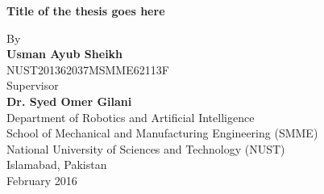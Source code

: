 \documentclass[11pt,a4paper]{report}
\numberwithin{equation}{section}
\begin{document}
    \newpage
    \begin{titlepage}
        \centering
        \vspace {1cm}
        \huge{\textbf{Title of the thesis goes here}} \\ [0.75cm]
        \begin{figure}[ht!]
            \centering
            \def\svgwidth{0.5\columnwidth}
            
        \end{figure}
        \vspace {0.5cm}
        \Large{By} \\
        \Large{\textbf{Usman Ayub Sheikh}} \\
        \Large{NUST201362037MSMME62113F} \\[0.75cm]
        \Large{Supervisor} \\
        \Large{\textbf{Dr. Syed Omer Gilani}} \\[0.75cm]
        \Large{Department of Robotics and Artificial Intelligence \\
        School of Mechanical and Manufacturing Engineering (SMME) \\
        National University of Sciences and Technology (NUST) \\
        Islamabad, Pakistan} \\ [0.75 cm]
        \Large{February 2016}
    \end{titlepage}
\end{document}
